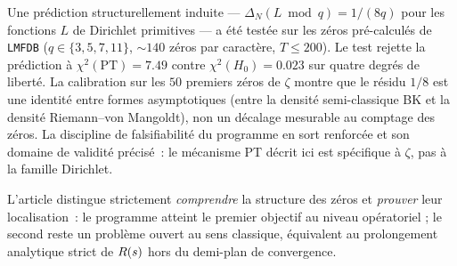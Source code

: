 Une prédiction structurellement induite --- $\Delta_N(L \bmod q) = 1/(8q)$
pour les fonctions $L$ de Dirichlet primitives --- a été testée sur les
zéros pré-calculés de \texttt{LMFDB} ($q \in \{3,5,7,11\}$, $\sim 140$
zéros par caractère, $T \le 200$). Le test rejette la prédiction à
$\chi^{2}(\mathrm{PT}) = 7.49$ contre $\chi^{2}(H_0) = 0.023$ sur quatre
degrés de liberté. La calibration sur les $50$ premiers zéros de $\zeta$
montre que le résidu $1/8$ est une identité entre formes asymptotiques
(entre la densité semi-classique BK et la densité Riemann--von Mangoldt),
non un décalage mesurable au comptage des zéros. La discipline de
falsifiabilité du programme en sort renforcée et son domaine de validité
précisé~: le mécanisme PT décrit ici est spécifique à $\zeta$, pas à la
famille Dirichlet.

L'article distingue strictement \emph{comprendre} la structure des zéros
et \emph{prouver} leur localisation~: le programme atteint le premier
objectif au niveau opératoriel ; le second reste un problème ouvert au
sens classique, équivalent au prolongement analytique strict de $R(s)$
hors du demi-plan de convergence.
